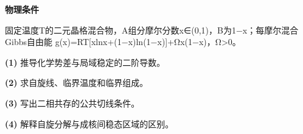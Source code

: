 \textbf{物理条件}\par 固定温度T的二元晶格混合物，A组分摩尔分数x∈(0,1)，B为1−x；每摩尔混合Gibbs自由能 g(x)=RT[xlnx+(1−x)ln(1−x)]+Ωx(1−x)，Ω>0。
\par\noindent\textbf{(1)} 推导化学势差与局域稳定的二阶导数。
\par\noindent\textbf{(2)} 求自旋线、临界温度和临界组成。
\par\noindent\textbf{(3)} 写出二相共存的公共切线条件。
\par\noindent\textbf{(4)} 解释自旋分解与成核间稳态区域的区别。
